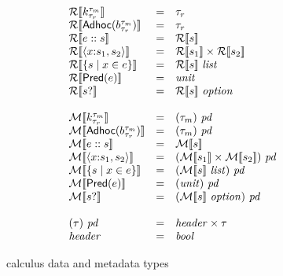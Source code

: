 \documentclass[nocopyrightspace,natbib]{sigplanconf}
\begin{document}
\begin{figure}

\[
\begin{array}{lcl}
\repty{\Sk} & = & \tau_r \\
\repty{\SAdhoc{b}} & = & \tau_r \\
\repty{\SPath{e}{s}} & = & \repty{s} \\
\repty{\SPair{x}{s_1}{s_2}} & = & \repty{s_1} \times \repty{s_2} \\
\repty{\SSetComp{s}{x}{e}} & = & \repty{s}~\typ{list}  \\
\repty{\SPred{e}} & = & \typ{unit} \\
\repty{\SOption{s}} & = & \repty{s}~\typ{option}  \\
\\
\mdty{\Sk} & = & \pd{\tau_m} \\
\mdty{\SAdhoc{b}} & = & \pd{\tau_m} \\
\mdty{\SPath{e}{s}} & = & \mdty{s} \\
\mdty{\SPair{x}{s_1}{s_2}} & = & \pd{\mdty{s_1} \times \mdty{s_2}} \\
\mdty{\SSetComp{s}{x}{e}} & = & \pd{\mdty{s}~\typ{list}}  \\
\mdty{\SPred{e}} & = & \pd{\typ{unit}} \\
\mdty{\SOption{s}} & = & \pd{\mdty{s}~\typ{option}}  \\
\\
\pd{\tau} & = & \typ{header} \times \tau \\
\typ{header} & = & \typ{bool} 
\end{array}
\]

\caption{\forest{} calculus data and metadata types}
\label{fig:calculus-types}
\end{figure}




\end{document}
